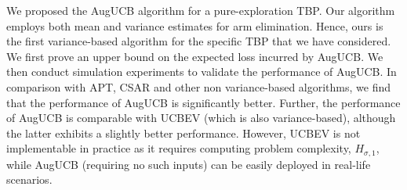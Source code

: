 We proposed the AugUCB algorithm for a pure-exploration TBP. Our algorithm employs both mean and variance estimates for arm elimination. Hence, ours is the first variance-based algorithm for the specific TBP that we have considered. We first prove an upper bound on the expected loss incurred by AugUCB. We then conduct simulation experiments to validate the performance of AugUCB. In comparison with APT, CSAR and other non variance-based algorithms, we find that the performance of AugUCB is significantly better. Further, the performance of AugUCB is comparable with UCBEV (which is also variance-based), although the latter exhibits a slightly better performance.  However, UCBEV is not implementable in practice as it requires computing problem complexity, $H_{\sigma,1}$, while AugUCB (requiring no such inputs) can be easily deployed in real-life scenarios.



